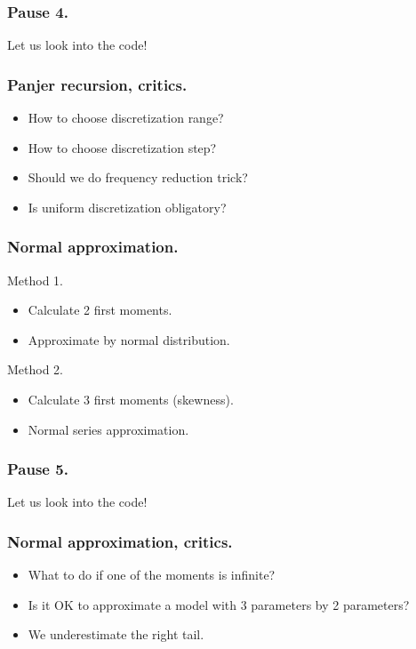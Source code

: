 \documentclass{beamer}
\begin{document}
\begin{frame}[fragile]
\frametitle{Pause 4.}
\begin{center}
Let us look into the code!
\end{center}
\end{frame}
\begin{frame}[fragile]
\frametitle{Panjer recursion, critics.}
\begin{itemize}
\item How to choose discretization range?
\item How to choose discretization step?
\item Should we do frequency reduction trick?
\item Is uniform discretization obligatory?
\end{itemize}
\end{frame}
\begin{frame}[fragile]
\frametitle{Normal approximation.}
Method 1. 
\begin{itemize}
\item Calculate 2 first moments.
\item Approximate by normal distribution.
\end{itemize}

Method 2.
\begin{itemize}
\item Calculate 3 first moments (skewness).
\item Normal series approximation.
\end{itemize}
\end{frame}
\begin{frame}[fragile]
\frametitle{Pause 5.}
\begin{center}
Let us look into the code!
\end{center}
\end{frame}
\begin{frame}[fragile]
\frametitle{Normal approximation, critics.}
\begin{itemize}
\item What to do if one of the moments is infinite?
\item Is it OK to approximate a model with 3 parameters by 2 parameters?
\item We underestimate the right tail.
\end{itemize}
\end{frame}
\end{document}
